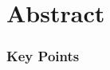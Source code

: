 \documentclass[letterpaper,12pt]{article}
\begin{document}


\begingroup
\let\newpage\relax%
\maketitle
\endgroup

\section*{Abstract}



\vspace{20pt}
\subsubsection*{Key Points}
{\small

}

\thispagestyle{empty}
\clearpage


\tableofcontents

\listoftables
\listoffigures

\pagebreak

\begin{spacing}{1.2}
\begin{linenumbers}

\end{linenumbers}
\end{spacing}

\pagebreak


{\small}
\end{document}
